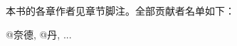\thispagestyle{empty}

\begin{center}
本书的各章作者见章节脚注。全部贡献者名单如下：

@奈德, @丹, ...


\end{center}

\setlength{\abovedisplayskip}{-5pt}
\setlength{\abovedisplayshortskip}{-5pt}